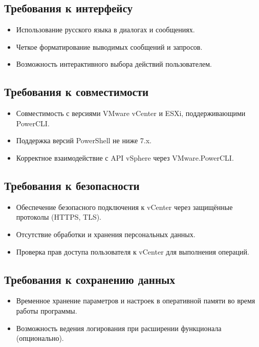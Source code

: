 \subsection{Требования к интерфейсу}

\begin{itemize}
    \item Использование русского языка в диалогах и сообщениях.
    \item Четкое форматирование выводимых сообщений и запросов.
    \item Возможность интерактивного выбора действий пользователем.
\end{itemize}

\subsection{Требования к совместимости}

\begin{itemize}
    \item Совместимость с версиями VMware vCenter и ESXi, поддерживающими PowerCLI.
    \item Поддержка версий PowerShell не ниже 7.x.
    \item Корректное взаимодействие с API vSphere через VMware.PowerCLI.
\end{itemize}

\subsection{Требования к безопасности}

\begin{itemize}
    \item Обеспечение безопасного подключения к vCenter через защищённые протоколы (HTTPS, TLS).
    \item Отсутствие обработки и хранения персональных данных.
    \item Проверка прав доступа пользователя к vCenter для выполнения операций.
\end{itemize}

\subsection{Требования к сохранению данных}

\begin{itemize}
    \item Временное хранение параметров и настроек в оперативной памяти во время работы программы.
    \item Возможность ведения логирования при расширении функционала (опционально).
\end{itemize}

